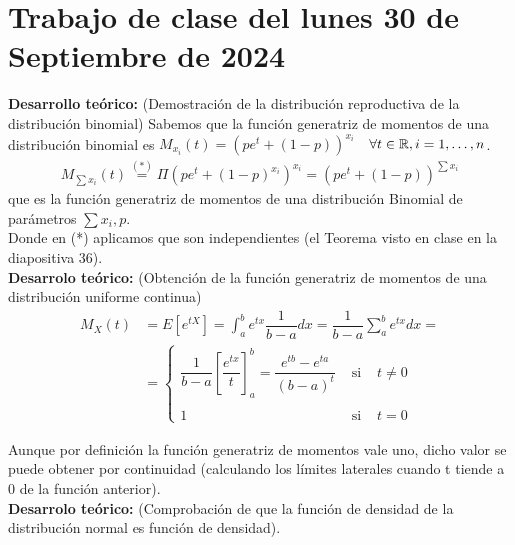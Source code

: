 \section{Trabajo de clase del lunes 30 de Septiembre de 2024}

\textbf{Desarrollo teórico:} (Demostración de la distribución reproductiva de la distribución binomial) Sabemos que la función generatriz de momentos de una distribución binomial es $M_{x_i}(t)=(pe^t+ (1-p))^{x_i}$\ \ $\forall t \in \mathbb{R}, i=1,\dots,n$.
\begin{gather*}
    M_{\sum x_i}(t)\overset{(*)}{=}\Pi \left( p e^t + (1-p)^{x_i}\right)^{x_i}=(pe^t+(1-p))^{\sum x_i}
\end{gather*}
que es la función generatriz de momentos de una distribución Binomial de parámetros $\sum x_i, p$.\\

Donde en (*) aplicamos que son independientes (el Teorema visto en clase en la diapositiva 36).\\

\textbf{Desarrolo teórico:} (Obtención de la función generatriz de momentos de una distribución uniforme continua) 
\begin{align*}
    M_X(t)&=E[e^{tX}]=\int_a^b e^{tx} \dfrac{1}{b-a}dx = \dfrac{1}{b-a} \sum_a^b e^{tx} dx =\\
    &=\left\{
        \begin{array}{ccc}
            \dfrac{1}{b-a}\left[\dfrac{e^{tx}}{t}\right]_a^b = \dfrac{e^{tb}-e^{ta}}{(b-a)^t}& \text{ si } & t\neq 0\\\\
            1 & \text{ si } & t=0
        \end{array}
    \right.
\end{align*} 

Aunque por definición la función generatriz de momentos vale uno, dicho valor se puede obtener por continuidad (calculando los límites laterales cuando t tiende a 0 de la función anterior).\\

\textbf{Desarrolo teórico:} (Comprobación de que la función de densidad de la distribución normal es función de densidad).\\

